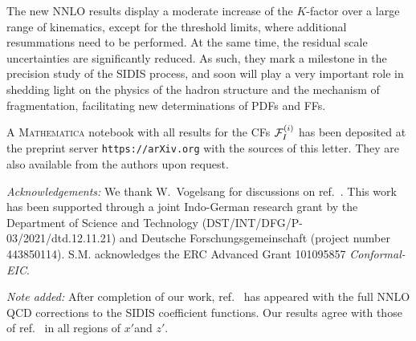 \documentclass[%
 twocolumn,
 superscriptaddress,
 preprintnumbers,
 nofootinbib,
 amsmath,amssymb,
 aps,
 prl,
]{revtex4}
\begin{document}
The new NNLO results display a moderate increase of the $K$-factor over a large range of kinematics, except for the threshold limits, where additional resummations need to be performed. At the same time, the residual scale uncertainties are significantly reduced.
As such, they mark a milestone in the precision study of the SIDIS process, and soon will play a very important role in shedding light on the physics of the hadron structure and the mechanism of fragmentation, facilitating new determinations of PDFs and FFs.

A \textsc{Mathematica} notebook with all results for the CFs ${\cal F}_I^{(i)}$ has been deposited at the preprint server {\tt https://arXiv.org} with the sources of this letter.
They are also available from the authors upon request.



\begin{acknowledgments}
\emph{Acknowledgements:}  
We thank W.~Vogelsang for discussions on ref.~\cite{Abele:2021nyo}.
This work has been supported through a joint Indo-German research grant by
the Department of Science and Technology (DST/INT/DFG/P-03/2021/dtd.12.11.21)
and Deutsche Forschungsgemeinschaft (project number 443850114).
S.M. acknowledges the ERC Advanced Grant 101095857 {\it Conformal-EIC}.

\emph{Note added:}
After completion of our work, ref.~\cite{Bonino:2024qbh} has appeared with the full NNLO QCD corrections to the SIDIS coefficient functions. 
Our results agree with those of ref.~\cite{Bonino:2024qbh} in all regions of $x'$and $z'$.
\end{acknowledgments}





\end{document}

